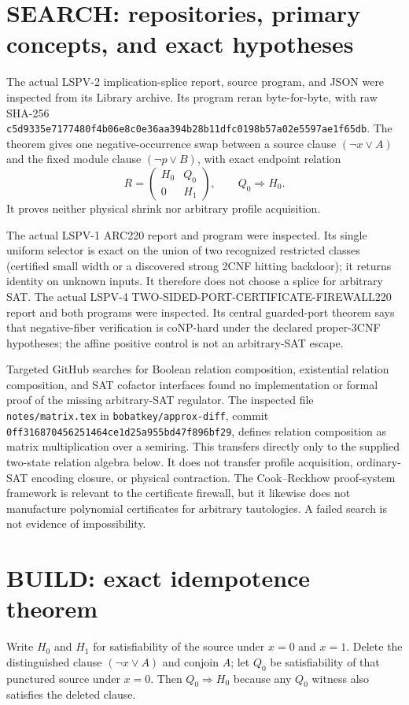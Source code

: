 \documentclass[11pt]{article}
\begin{document}
\section{SEARCH: repositories, primary concepts, and exact hypotheses}
The actual LSPV-2 implication-splice report, source program, and JSON were
inspected from its Library archive. Its program reran byte-for-byte, with raw
SHA-256
\texttt{c5d9335e7177480f4b06e8c0e36aa394b28b11dfc0198b57a02e5597ae1f65db}.
The theorem gives one negative-occurrence swap between a source clause
$(\neg x\vee A)$ and the fixed module clause $(\neg p\vee B)$, with exact
endpoint relation
\[
 R=\begin{pmatrix}H_0&Q_0\\0&H_1\end{pmatrix},\qquad Q_0\Rightarrow H_0.
\]
It proves neither physical shrink nor arbitrary profile acquisition.

The actual LSPV-1 ARC220 report and program were inspected. Its single uniform
selector is exact on the union of two recognized restricted classes
(certified small width or a discovered strong 2CNF hitting backdoor); it
returns identity on unknown inputs. It therefore does not choose a splice for
arbitrary SAT. The actual LSPV-4 TWO-SIDED-PORT-CERTIFICATE-FIREWALL220 report
and both programs were inspected. Its central guarded-port theorem says that
negative-fiber verification is coNP-hard under the declared proper-3CNF
hypotheses; the affine positive control is not an arbitrary-SAT escape.

Targeted GitHub searches for Boolean relation composition, existential
relation composition, and SAT cofactor interfaces found no implementation or
formal proof of the missing arbitrary-SAT regulator. The inspected file
\texttt{notes/matrix.tex} in \texttt{bobatkey/approx-diff}, commit
\texttt{0ff316870456251464ce1d25a955bd47f896bf29}, defines relation composition
as matrix multiplication over a semiring. This transfers directly only to
the supplied two-state relation algebra below. It does not transfer profile
acquisition, ordinary-SAT encoding closure, or physical contraction. The
Cook--Reckhow proof-system framework is relevant to the certificate firewall,
but it likewise does not manufacture polynomial certificates for arbitrary
tautologies. A failed search is not evidence of impossibility.

\section{BUILD: exact idempotence theorem}
Write $H_0$ and $H_1$ for satisfiability of the source under $x=0$ and $x=1$.
Delete the distinguished clause $(\neg x\vee A)$ and conjoin $A$; let $Q_0$
be satisfiability of that punctured source under $x=0$. Then
$Q_0\Rightarrow H_0$ because any $Q_0$ witness also satisfies the deleted
clause.
\end{document}
